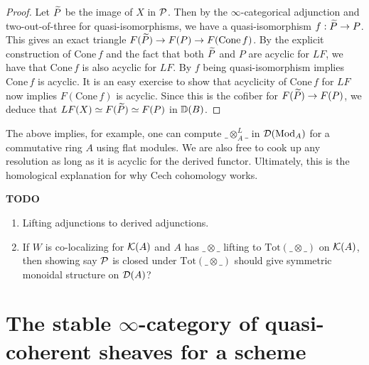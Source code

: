 \documentclass{article}
\begin{document}
\begin{proof}
  Let $\widetilde{P}$ be the image of $X$ in $\mathcal{P}$.
  Then by the $\infty$-categorical adjunction
  and two-out-of-three for quasi-isomorphisms,
  we have a quasi-isomorphism $f : \widetilde{P} \to P$.
  This gives an exact triangle $F(\widetilde{P}) \to F(P) \to F(\mathrm{Cone}\,f)$.
  By the explicit construction of $\mathrm{Cone}\,f$ and
  the fact that both $\widetilde{P}$ and $P$ are acyclic for $LF$,
  we have that $\mathrm{Cone}\,f$ is also acyclic for $LF$.
  By $f$ being quasi-isomorphism implies $\mathrm{Cone}\,f$ is acyclic.
  It is an easy exercise to show that 
  acyclicity of $\mathrm{Cone}\,f$ for $LF$ now implies
  $F(\mathrm{Cone}\,f)$ is acyclic.
  Since this is the cofiber for $F(\widetilde{P}) \to F(P)$,
  we deduce that $LF(X) \simeq F(\widetilde{P}) \simeq F(P)$ in $\mathbb{D}(B)$.
\end{proof}
The above implies, for example,
one can compute $\_ \otimes_A^L \_$ in $\mathcal{D}(\mathrm{Mod}_A)$ for a commutative ring $A$
using flat modules.
We are also free to cook up any resolution as long as
it is acyclic for the derived functor.
Ultimately, this is the homological explanation for why Cech cohomology works.

\textbf{TODO}
\begin{enumerate}
  \item Lifting adjunctions to derived adjunctions.
  \item If $W$ is co-localizing for $\mathcal{K}(A)$
  and $A$ has $\_ \otimes \_$ lifting to $\mathrm{Tot}(\_ \otimes \_)$
  on $\mathcal{K}(A)$,
  then showing say $\mathcal{P}$ is closed under $\mathrm{Tot(\_ \otimes \_)}$
  should give symmetric monoidal structure on $\mathcal{D}(A)$?
\end{enumerate}

\section{The stable $\infty$-category of quasi-coherent sheaves for a scheme}
\end{document}
